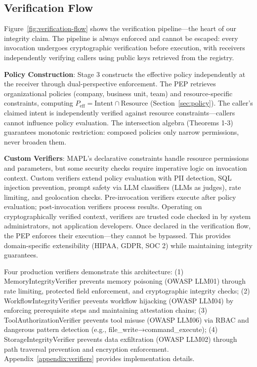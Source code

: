 \subsection{Verification Flow}

Figure~\ref{fig:verification-flow} shows the verification pipeline—the heart of our integrity claim. The pipeline is always enforced and cannot be escaped: every invocation undergoes cryptographic verification before execution, with receivers independently verifying callers using public keys retrieved from the registry.

\textbf{Policy Construction}: Stage 3 constructs the effective policy independently at the receiver through dual-perspective enforcement. The PEP retrieves organizational policies (company, business unit, team) and resource-specific constraints, computing $P_{\text{eff}} = \text{Intent} \cap \text{Resource}$ (Section~\ref{sec:policy}). The caller's claimed intent is independently verified against resource constraints—callers cannot influence policy evaluation. The intersection algebra (Theorems 1-3) guarantees monotonic restriction: composed policies only narrow permissions, never broaden them.

\textbf{Custom Verifiers}: MAPL's declarative constraints handle resource permissions and parameters, but some security checks require imperative logic on invocation context. Custom verifiers extend policy evaluation with PII detection, SQL injection prevention, prompt safety via LLM classifiers (LLMs as judges), rate limiting, and geolocation checks. Pre-invocation verifiers execute after policy evaluation; post-invocation verifiers process results. Operating on cryptographically verified context, verifiers are trusted code checked in by system administrators, not application developers. Once declared in the verification flow, the PEP enforces their execution—they cannot be bypassed. This provides domain-specific extensibility (HIPAA, GDPR, SOC 2) while maintaining integrity guarantees.

Four production verifiers demonstrate this architecture: (1) MemoryIntegrityVerifier prevents memory poisoning (OWASP LLM01) through rate limiting, protected field enforcement, and cryptographic integrity checks; (2) WorkflowIntegrityVerifier prevents workflow hijacking (OWASP LLM04) by enforcing prerequisite steps and maintaining attestation chains; (3) ToolAuthorizationVerifier prevents tool misuse (OWASP LLM06) via RBAC and dangerous pattern detection (e.g., file\_write→command\_execute); (4) StorageIntegrityVerifier prevents data exfiltration (OWASP LLM02) through path traversal prevention and encryption enforcement. Appendix~\ref{appendix:verifiers} provides implementation details.

